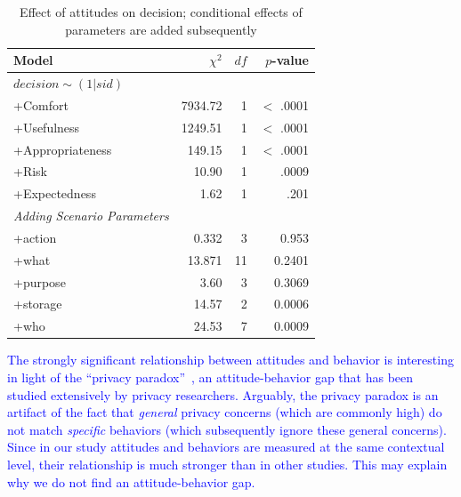 \begin{table}
	\centering
	\caption{Effect of attitudes on decision; conditional effects of parameters are added subsequently}
	\label{tab:att_decision}
	\begin{tabular}{ l | r | r | r }
		\hline
		Model &	$\chi^2$ & $df$ & $p$-value 	\\ \hline
		$decision\sim(1 | sid)$ &		  	&	    &				\\
		+Comfort &					7934.72	& 	  1 & 		$<$ .0001 	\\
		+Usefulness &					1249.51 &		  1 &		$<$ .0001 	\\
		+Appropriateness &				149.15 & 	  1 & 		  	$<$ .0001	\\
		+Risk  &			10.90 &		  1 & 		 .0009 	\\
		+Expectedness &			1.62 &		  1 & 		 .201\\\hline
		\emph{Adding Scenario Parameters}&			 &		  & \\\hline
		+action &			0.332 &		  3 & 		 0.953\\
		+what &			13.871 &		  11 & 		0.2401\\
		+purpose &			3.60 &		  3 & 		0.3069\\
		+storage &			14.57 &		  2 & 		0.0006\\
		+who &			24.53 &		  7 & 		0.0009\\
		\hline
	\end{tabular}
\end{table}

\textcolor{blue}{The strongly significant relationship between attitudes and behavior is interesting in light of the ``privacy paradox''~\cite{norberg07}, an attitude-behavior gap that has been studied extensively by privacy researchers. Arguably, the privacy paradox is an artifact of the fact that \emph{general} privacy concerns (which are commonly high) do not match \emph{specific} behaviors (which subsequently ignore these general concerns). Since in our study attitudes and behaviors are measured at the same contextual level, their relationship is much stronger than in other studies. This may explain why we do not find an attitude-behavior gap.}


